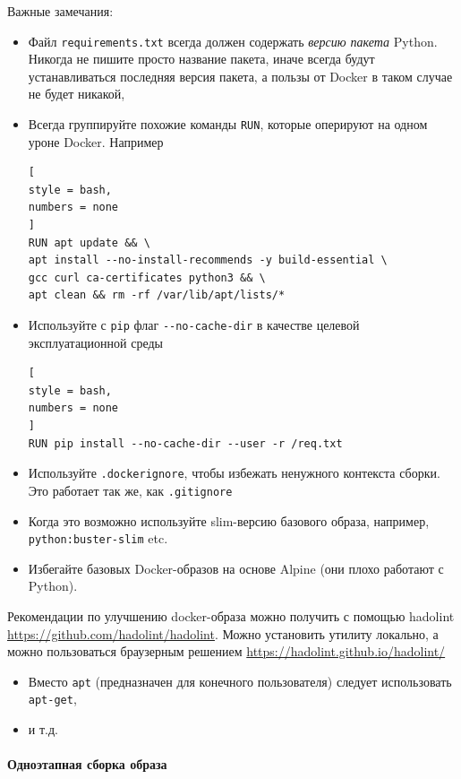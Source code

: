 \documentclass[%
	11pt,
	a4paper,
	utf8,
		]{article}
\begin{document}
Важные замечания:
\begin{itemize}
	\item Файл \texttt{requirements.txt} всегда должен содержать \emph{версию пакета} Python. Никогда не пишите просто название пакета, иначе всегда будут устанавливаться последняя версия пакета, а пользы от Docker в таком случае не будет никакой,
	
	\item Всегда группируйте похожие команды \texttt{RUN}, которые оперируют на одном уроне Docker. Например
\begin{lstlisting}[
style = bash,
numbers = none	
]
RUN apt update && \
apt install --no-install-recommends -y build-essential \
gcc curl ca-certificates python3 && \
apt clean && rm -rf /var/lib/apt/lists/*
\end{lstlisting}

   \item Используйте с \texttt{pip} флаг \verb|--no-cache-dir| в качестве целевой эксплуатационной среды
\begin{lstlisting}[
style = bash,
numbers = none	
]
RUN pip install --no-cache-dir --user -r /req.txt
\end{lstlisting}

    \item Используйте \texttt{.dockerignore}, чтобы избежать ненужного контекста сборки. Это работает так же, как \texttt{.gitignore}
    
    \item Когда это возможно используйте slim-версию базового образа, например, \texttt{python:buster-slim} etc.
    
    \item Избегайте базовых Docker-образов на основе Alpine (они плохо работают с Python).
\end{itemize}

Рекомендации по улучшению docker-образа можно получить с помощью hadolint \url{https://github.com/hadolint/hadolint}. Можно установить утилиту локально, а можно пользоваться браузерным решением \url{https://hadolint.github.io/hadolint/}
\begin{itemize}
	\item Вместо \verb|apt| (предназначен для конечного пользователя) следует использовать \verb|apt-get|,
	
	\item и т.д.
\end{itemize}

\paragraph{Одноэтапная сборка образа}
\end{document}
